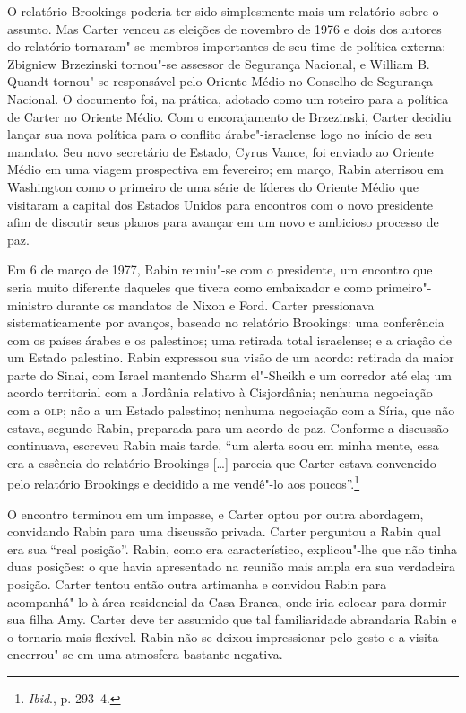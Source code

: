O relatório Brookings poderia ter sido simplesmente mais um relatório
sobre o assunto. Mas Carter venceu as eleições de novembro de 1976 e
dois dos autores do relatório tornaram"-se membros importantes de seu
time de política externa: Zbigniew Brzezinski tornou"-se assessor de
Segurança Nacional, e William B. Quandt tornou"-se responsável pelo Oriente
Médio no Conselho de Segurança Nacional. O documento foi, na prática,
adotado como um roteiro para a política de Carter no Oriente Médio. Com
o encorajamento de Brzezinski, Carter decidiu lançar sua nova política
para o conflito árabe"-israelense logo no início de seu mandato. Seu novo
secretário de Estado, Cyrus Vance, foi enviado ao Oriente Médio em uma
viagem prospectiva em fevereiro; em março, Rabin aterrisou em Washington
como o primeiro de uma série de líderes do Oriente Médio que visitaram
a capital dos Estados Unidos para encontros com o novo presidente afim de discutir
seus planos para avançar em um novo e ambicioso processo de paz.

Em 6 de março de 1977, Rabin reuniu"-se com o presidente, um encontro
que seria muito diferente daqueles que tivera como embaixador e como
primeiro"-ministro durante os mandatos de Nixon e Ford. Carter
pressionava sistematicamente por avanços, baseado no relatório
Brookings: uma conferência com os países árabes e os palestinos; uma
retirada total israelense; e a criação de um Estado palestino. Rabin
expressou sua visão de um acordo: retirada da maior parte do Sinai, com
Israel mantendo Sharm el"-Sheikh e um corredor até ela; um acordo
territorial com a Jordânia relativo à Cisjordânia; nenhuma negociação
com a \textsc{olp}; não a um Estado palestino; nenhuma negociação com a Síria, que
não estava, segundo Rabin, preparada para um acordo de paz. Conforme a
discussão continuava, escreveu Rabin mais tarde, ``um alerta soou em
minha mente, essa era a essência do relatório Brookings {[}\ldots{}{]} parecia que
Carter estava convencido pelo relatório Brookings e decidido a me
vendê"-lo aos poucos''.\footnote{\textit{Ibid}., p. 293--4.}

O encontro terminou em um impasse, e Carter optou por outra abordagem,
convidando Rabin para uma discussão privada. Carter perguntou a Rabin
qual era sua ``real posição''. Rabin, como era característico,
explicou"-lhe que não tinha duas posições: o que havia apresentado na
reunião mais ampla era sua verdadeira posição. Carter tentou então outra
artimanha e convidou Rabin para acompanhá"-lo à área residencial da Casa
Branca, onde iria colocar para dormir sua filha Amy. Carter deve ter
assumido que tal familiaridade abrandaria Rabin e o tornaria mais
flexível. Rabin não se deixou impressionar pelo gesto e a visita
encerrou"-se em uma atmosfera bastante negativa.

